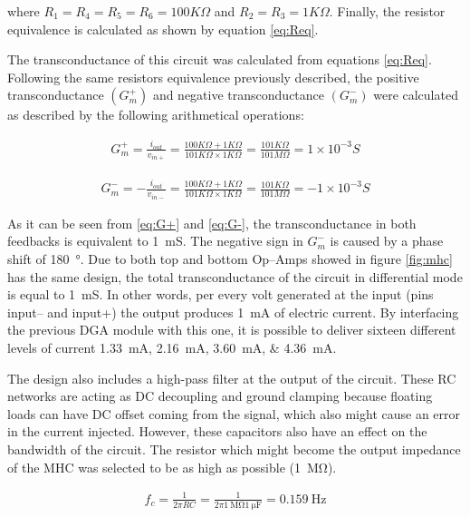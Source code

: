 where $R_1=R_4=R_5=R_6=100K\Omega$ and $R_2=R_3=1K\Omega$. Finally, the resistor equivalence is calculated as shown by equation \ref{eq:Req}. 

The transconductance of this circuit was calculated from equations \ref{eq:Req}. Following the same resistors equivalence previously described, the positive  transconductance $(G^+_m)$ and negative transconductance $(G^-_m)$ were calculated as described by the following arithmetical operations:


\begin{align}
\label{eq:G+}
G^+_m=\frac{i_{out}}{v_{in+}}=\frac{100K\Omega + 1K\Omega}{101K\Omega \times 1K\Omega}=\frac{101K\Omega}{101M\Omega}=1\times10^{-3}S 
\end{align}

\begin{align}
\label{eq:G-}
G^-_m=-\frac{i_{out}}{v_{in-}}=\frac{100K\Omega + 1K\Omega}{101K\Omega \times 1K\Omega}=\frac{101K\Omega}{101M\Omega}=-1\times10^{-3}S 
\end{align}

As it can be seen from \ref{eq:G+} and \ref{eq:G-}, the transconductance in both feedbacks is equivalent to \SI{1}{\milli\siemens}. The negative sign in $G^{-}_m$ is caused by a phase shift of \SI{180}{\degree}. Due to both top and bottom Op–Amps showed in figure \ref{fig:mhc} has the same design, the total transconductance of the circuit in differential mode is equal to \SI{1}{\milli\siemens}. In other words, per every volt generated at the input (pins input– and input+) the output produces \SI{1}{\mA} of electric current. By interfacing the previous DGA module with this one, it is possible to deliver sixteen different levels of current \SIlist{1.33;2.16;3.60;4.36}{\mA}.

The design also includes a high-pass filter at the output of the circuit. These RC networks are acting as DC decoupling and ground clamping because floating loads can have DC offset coming from the signal, which also might cause an error in the current injected. However, these capacitors also have an effect on the bandwidth of the circuit. The resistor which might become the output impedance of the MHC was selected to be as high as possible (\SI{1}{\mega\ohm}).

\begin{align}
	\label{eq:MHC filter}
	f_c = \frac{1}{2 \pi R C} = \frac{1}{2 \pi \SI{1}{\mega\ohm} \SI{1}{\micro\farad}} = \SI{0.159}{\hertz}
\end{align}

